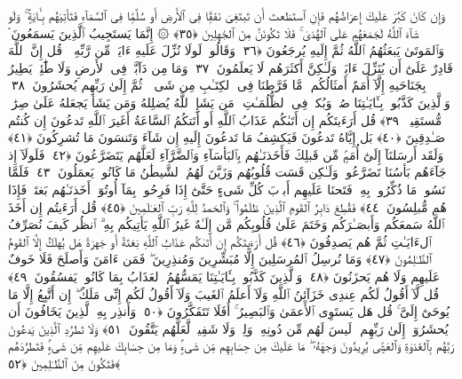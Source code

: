  وَإِن كَانَ كَبُرَ عَلَيكَ إِعرَاضُهُم فَإِنِ ٱستَطَعتَ أَن تَبتَغِىَ نَفَقًۭا فِى ٱلأَرضِ أَو سُلَّمًۭا فِى ٱلسَّمَآءِ فَتَأتِيَهُم بِـَٔايَةٍۢ ۚ وَلَو شَآءَ ٱللَّهُ لَجَمَعَهُم عَلَى ٱلهُدَىٰ ۚ فَلَا تَكُونَنَّ مِنَ ٱلجَٰهِلِينَ ﴿٣٥﴾
 ۞ إِنَّمَا يَستَجِيبُ ٱلَّذِينَ يَسمَعُونَ ۘ وَٱلمَوتَىٰ يَبعَثُهُمُ ٱللَّهُ ثُمَّ إِلَيهِ يُرجَعُونَ ﴿٣٦﴾
 وَقَالُوا۟ لَولَا نُزِّلَ عَلَيهِ ءَايَةٌۭ مِّن رَّبِّهِۦ ۚ قُل إِنَّ ٱللَّهَ قَادِرٌ عَلَىٰٓ أَن يُنَزِّلَ ءَايَةًۭ وَلَـٰكِنَّ أَكثَرَهُم لَا يَعلَمُونَ ﴿٣٧﴾
 وَمَا مِن دَآبَّةٍۢ فِى ٱلأَرضِ وَلَا طَٰٓئِرٍۢ يَطِيرُ بِجَنَاحَيهِ إِلَّآ أُمَمٌ أَمثَالُكُم ۚ مَّا فَرَّطنَا فِى ٱلكِتَـٰبِ مِن شَىءٍۢ ۚ ثُمَّ إِلَىٰ رَبِّهِم يُحشَرُونَ ﴿٣٨﴾
 وَٱلَّذِينَ كَذَّبُوا۟ بِـَٔايَـٰتِنَا صُمٌّۭ وَبُكمٌۭ فِى ٱلظُّلُمَـٰتِ ۗ مَن يَشَإِ ٱللَّهُ يُضلِلهُ وَمَن يَشَأ يَجعَلهُ عَلَىٰ صِرَٰطٍۢ مُّستَقِيمٍۢ ﴿٣٩﴾
 قُل أَرَءَيتَكُم إِن أَتَىٰكُم عَذَابُ ٱللَّهِ أَو أَتَتكُمُ ٱلسَّاعَةُ أَغَيرَ ٱللَّهِ تَدعُونَ إِن كُنتُم صَـٰدِقِينَ ﴿٤٠﴾
 بَل إِيَّاهُ تَدعُونَ فَيَكشِفُ مَا تَدعُونَ إِلَيهِ إِن شَآءَ وَتَنسَونَ مَا تُشرِكُونَ ﴿٤١﴾
 وَلَقَد أَرسَلنَآ إِلَىٰٓ أُمَمٍۢ مِّن قَبلِكَ فَأَخَذنَـٰهُم بِٱلبَأسَآءِ وَٱلضَّرَّآءِ لَعَلَّهُم يَتَضَرَّعُونَ ﴿٤٢﴾
 فَلَولَآ إِذ جَآءَهُم بَأسُنَا تَضَرَّعُوا۟ وَلَـٰكِن قَسَت قُلُوبُهُم وَزَيَّنَ لَهُمُ ٱلشَّيطَٰنُ مَا كَانُوا۟ يَعمَلُونَ ﴿٤٣﴾
 فَلَمَّا نَسُوا۟ مَا ذُكِّرُوا۟ بِهِۦ فَتَحنَا عَلَيهِم أَبوَٟبَ كُلِّ شَىءٍ حَتَّىٰٓ إِذَا فَرِحُوا۟ بِمَآ أُوتُوٓا۟ أَخَذنَـٰهُم بَغتَةًۭ فَإِذَا هُم مُّبلِسُونَ ﴿٤٤﴾
 فَقُطِعَ دَابِرُ ٱلقَومِ ٱلَّذِينَ ظَلَمُوا۟ ۚ وَٱلحَمدُ لِلَّهِ رَبِّ ٱلعَـٰلَمِينَ ﴿٤٥﴾
 قُل أَرَءَيتُم إِن أَخَذَ ٱللَّهُ سَمعَكُم وَأَبصَـٰرَكُم وَخَتَمَ عَلَىٰ قُلُوبِكُم مَّن إِلَـٰهٌ غَيرُ ٱللَّهِ يَأتِيكُم بِهِ ۗ ٱنظُر كَيفَ نُصَرِّفُ ٱلءَايَـٰتِ ثُمَّ هُم يَصدِفُونَ ﴿٤٦﴾
 قُل أَرَءَيتَكُم إِن أَتَىٰكُم عَذَابُ ٱللَّهِ بَغتَةً أَو جَهرَةً هَل يُهلَكُ إِلَّا ٱلقَومُ ٱلظَّـٰلِمُونَ ﴿٤٧﴾
 وَمَا نُرسِلُ ٱلمُرسَلِينَ إِلَّا مُبَشِّرِينَ وَمُنذِرِينَ ۖ فَمَن ءَامَنَ وَأَصلَحَ فَلَا خَوفٌ عَلَيهِم وَلَا هُم يَحزَنُونَ ﴿٤٨﴾
 وَٱلَّذِينَ كَذَّبُوا۟ بِـَٔايَـٰتِنَا يَمَسُّهُمُ ٱلعَذَابُ بِمَا كَانُوا۟ يَفسُقُونَ ﴿٤٩﴾
 قُل لَّآ أَقُولُ لَكُم عِندِى خَزَآئِنُ ٱللَّهِ وَلَآ أَعلَمُ ٱلغَيبَ وَلَآ أَقُولُ لَكُم إِنِّى مَلَكٌ ۖ إِن أَتَّبِعُ إِلَّا مَا يُوحَىٰٓ إِلَىَّ ۚ قُل هَل يَستَوِى ٱلأَعمَىٰ وَٱلبَصِيرُ ۚ أَفَلَا تَتَفَكَّرُونَ ﴿٥٠﴾
 وَأَنذِر بِهِ ٱلَّذِينَ يَخَافُونَ أَن يُحشَرُوٓا۟ إِلَىٰ رَبِّهِم ۙ لَيسَ لَهُم مِّن دُونِهِۦ وَلِىٌّۭ وَلَا شَفِيعٌۭ لَّعَلَّهُم يَتَّقُونَ ﴿٥١﴾
 وَلَا تَطرُدِ ٱلَّذِينَ يَدعُونَ رَبَّهُم بِٱلغَدَوٰةِ وَٱلعَشِىِّ يُرِيدُونَ وَجهَهُۥ ۖ مَا عَلَيكَ مِن حِسَابِهِم مِّن شَىءٍۢ وَمَا مِن حِسَابِكَ عَلَيهِم مِّن شَىءٍۢ فَتَطرُدَهُم فَتَكُونَ مِنَ ٱلظَّـٰلِمِينَ ﴿٥٢﴾
